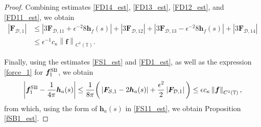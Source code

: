 \documentclass[11pt]{article}
\numberwithin{equation}{section}
\newcommand{\T}{\mathbb{T}}
\newcommand{\be}{\bm{e}}
\newcommand{\SB}{{\rm SB}}
\newcommand{\abs}[1]{\left\lvert #1 \right\rvert}
\newcommand{\norm}[1]{\left\lVert #1 \right\rVert}
\newcommand{\mc}[1]{\mathcal{#1}}
\theoremstyle{definition}
\begin{document}
\begin{proof}
%

Combining estimates \eqref{FD14_est}, \eqref{FD13_est}, \eqref{FD12_est}, and \eqref{FD11_est}, we obtain
\begin{equation}\label{FD1_est}
\begin{aligned}
\abs{\bm{F}_{\mc{D},1}} &\le \abs{3\bm{F}_{\mc{D},11}+\epsilon^{-2} 8\bm{h}_f(s)} + \abs{3\bm{F}_{\mc{D},12}}+\abs{3\bm{F}_{\mc{D},13}-\epsilon^{-2} 8\bm{h}_f(s)} + \abs{3\bm{F}_{\mc{D},14}} \\
&\le \epsilon^{-1} c_\kappa\norm{\bm{f}}_{C^1(\T)}.
\end{aligned}
\end{equation}

Finally, using the estimates \eqref{FS1_est} and \eqref{FD1_est}, as well as the expression \eqref{force_1} for $\bm{f}_1^{\SB}$, we obtain
\begin{equation}\label{f1sb_est0}
\abs{\bm{f}^{\SB}_1 - \frac{1}{4\pi}\bm{h}_a(s)} \le \frac{1}{8\pi}\bigg(\abs{\bm{F}_{\mc{S},1}- 2\bm{h}_a(s)} +\frac{\epsilon^2}{2}\abs{\bm{F}_{\mc{D},1}}\bigg) \le \epsilon c_\kappa \norm{\bm{f}}_{C^1(\T)},
\end{equation}
from which, using the form of $\bm{h}_a(s)$ in \eqref{FS11_est}, we obtain Proposition \ref{fSB1_est}.
\end{proof}

\end{document}
